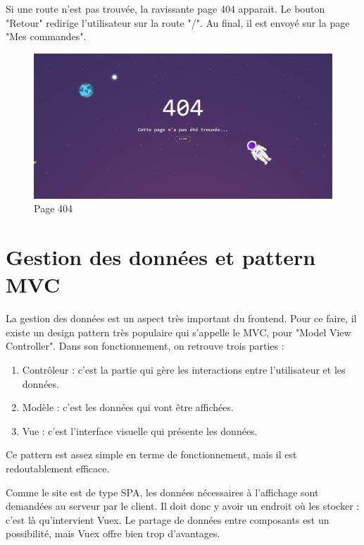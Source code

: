 \documentclass[
    iai, %
    eai, %
]{heig-tb}
\begin{document}
Si une route n'est pas trouvée, la ravissante page 404 apparait. Le bouton "Retour" redirige l'utilisateur sur la route "/". Au final, il est envoyé sur la page "Mes commandes".

\begin{figure}[h]
  \includegraphics[width=14cm]{ui_404.PNG}
  \caption{Page 404}
\end{figure}


\newpage
\section{Gestion des données et pattern MVC}
La gestion des données est un aspect très important du frontend.
Pour ce faire, il existe un design pattern très populaire qui s'appelle le MVC, pour "Model View Controller".
Dans son fonctionnement, on retrouve trois parties :
\begin{enumerate}
  \item Contrôleur : c'est la partie qui gère les interactions entre l'utilisateur et les données.
  \item Modèle : c'est les données qui vont être affichées.
  \item Vue : c'est l'interface visuelle qui présente les données.
\end{enumerate}
\bigskip

Ce pattern est assez simple en terme de fonctionnement, mais il est redoutablement efficace.


Comme le site est de type SPA, les données nécessaires à l'affichage sont demandées au serveur par le client.
Il doit donc y avoir un endroit où les stocker : c'est là qu'intervient Vuex.
Le partage de données entre composants est un possibilité, mais Vuex offre bien trop d'avantages.
\end{document}
